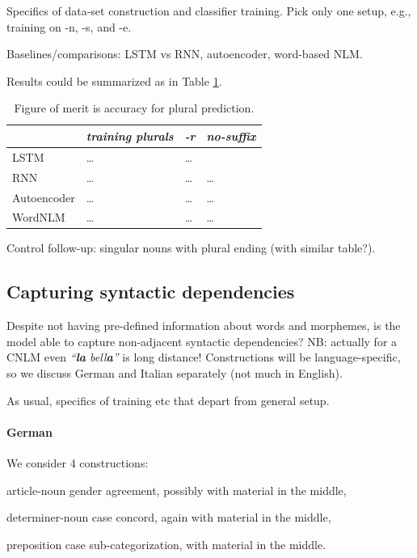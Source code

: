 Specifics of data-set construction and classifier training. Pick only one setup, e.g., training on -n, -s, and -e.

Baselines/comparisons: LSTM vs RNN, autoencoder, word-based NLM.

Results could be summarized as in Table \ref{tab:number-results}.


\begin{table}[t]
  \begin{center}
    \begin{tabular}{l|l|l|l}
      \multicolumn{1}{c}{}&\emph{training plurals}&\emph{-r}&\emph{no-suffix}\\
      \hline
      LSTM&\ldots&\ldots\\
      RNN&\ldots&\ldots&\ldots\\
      Autoencoder&\ldots&\ldots&\ldots\\
      WordNLM&\ldots&\ldots&\ldots\\
    \end{tabular}
  \end{center}
  \caption{\label{tab:number-results} Figure of merit is accuracy for plural prediction.}
\end{table}


Control follow-up: singular nouns with plural ending (with similar table?).

\subsection{Capturing syntactic dependencies}
\label{sec:dependencies}

Despite not having pre-defined information about words and morphemes,
is the model able to capture non-adjacent syntactic dependencies? NB:
actually for a CNLM even \emph{``\textbf{la} bell\textbf{a}''} is long
distance! Constructions will be language-specific, so we discuss
German and Italian separately (not much in English).

As usual, specifics of training etc that depart from general setup.

\paragraph{German} We consider 4 constructions:
\begin{inparaenum}[i)]
\item article-noun gender agreement, possibly with material in the middle,
\item determiner-noun case concord, again with material in the middle,
\item preposition case sub-categorization, with material in the middle.
\end{inparaenum}


